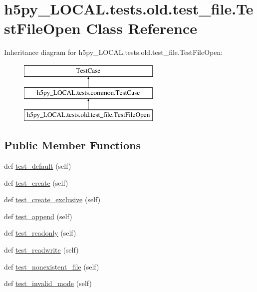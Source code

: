 \hypertarget{classh5py__LOCAL_1_1tests_1_1old_1_1test__file_1_1TestFileOpen}{}\section{h5py\+\_\+\+L\+O\+C\+A\+L.\+tests.\+old.\+test\+\_\+file.\+Test\+File\+Open Class Reference}
\label{classh5py__LOCAL_1_1tests_1_1old_1_1test__file_1_1TestFileOpen}
Inheritance diagram for h5py\+\_\+\+L\+O\+C\+A\+L.\+tests.\+old.\+test\+\_\+file.\+Test\+File\+Open\+:\begin{figure}[H]
\begin{center}
\leavevmode
\includegraphics[height=3.000000cm]{classh5py__LOCAL_1_1tests_1_1old_1_1test__file_1_1TestFileOpen}
\end{center}
\end{figure}
\subsection*{Public Member Functions}
\begin{DoxyCompactItemize}
\item 
def \hyperlink{classh5py__LOCAL_1_1tests_1_1old_1_1test__file_1_1TestFileOpen_a03eb8c30d3dee1a46e53a156445b36ec}{test\+\_\+default} (self)
\item 
def \hyperlink{classh5py__LOCAL_1_1tests_1_1old_1_1test__file_1_1TestFileOpen_aff1f3cb5c97372c76726c1688a302888}{test\+\_\+create} (self)
\item 
def \hyperlink{classh5py__LOCAL_1_1tests_1_1old_1_1test__file_1_1TestFileOpen_a8943c929a897e6642aebbdf942d20330}{test\+\_\+create\+\_\+exclusive} (self)
\item 
def \hyperlink{classh5py__LOCAL_1_1tests_1_1old_1_1test__file_1_1TestFileOpen_ab8f7c9c271dbea13d6dbd33da41f1351}{test\+\_\+append} (self)
\item 
def \hyperlink{classh5py__LOCAL_1_1tests_1_1old_1_1test__file_1_1TestFileOpen_acbfdb1559c74e5989e274134882e4012}{test\+\_\+readonly} (self)
\item 
def \hyperlink{classh5py__LOCAL_1_1tests_1_1old_1_1test__file_1_1TestFileOpen_a4307b236c173c958153e1db1aeaf4469}{test\+\_\+readwrite} (self)
\item 
def \hyperlink{classh5py__LOCAL_1_1tests_1_1old_1_1test__file_1_1TestFileOpen_a9af6d2db022ace9a8af56782484a91cc}{test\+\_\+nonexistent\+\_\+file} (self)
\item 
def \hyperlink{classh5py__LOCAL_1_1tests_1_1old_1_1test__file_1_1TestFileOpen_a26febb0aa2dfeb55a2d1b8e00140444b}{test\+\_\+invalid\+\_\+mode} (self)
\end{DoxyCompactItemize}
